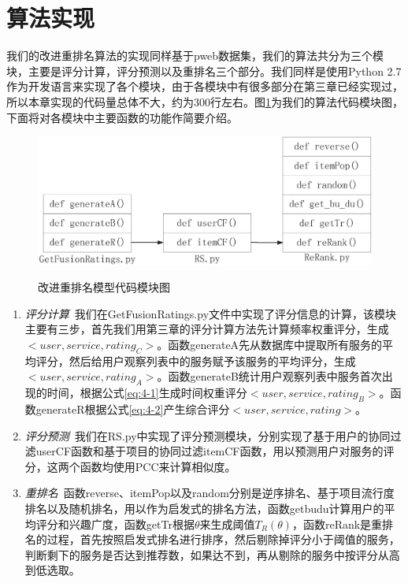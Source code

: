 \documentclass[master,winfonts]{njuthesis}
\newcommand{\li}{\uline{\hspace{0.5em}}}
\begin{document}
\section{算法实现}
我们的改进重排名算法的实现同样基于pweb数据集，我们的算法共分为三个模块，主要是评分计算，评分预测以及重排名三个部分。我们同样是使用Python 2.7作为开发语言来实现了各个模块，由于各模块中有很多部分在第三章已经实现过，所以本章实现的代码量总体不大，约为300行左右。图\ref{fig:4-20}为我们的算法代码模块图，下面将对各模块中主要函数的功能作简要介绍。
\begin{figure}[htbp]
  \centering
  \includegraphics[width=\textwidth]{Code2.eps}\\
  \caption{改进重排名模型代码模块图}\label{fig:4-20}
\end{figure}

\begin{enumerate}
\item \emph{评分计算}~我们在GetFusionRatings.py文件中实现了评分信息的计算，该模块主要有三步，首先我们用第三章的评分计算方法先计算频率权重评分，生成$<user,service,rating_C>$。函数generateA先从数据库中提取所有服务的平均评分，然后给用户观察列表中的服务赋予该服务的平均评分，生成$<user,service,rating_A>$。函数generateB统计用户观察列表中服务首次出现的时间，根据公式\eqref{eq:4-1}生成时间权重评分$<user,service,rating_B>$。函数generateR根据公式\eqref{eq:4-2}产生综合评分$<user,service,rating>$。

\item \emph{评分预测}~我们在RS.py中实现了评分预测模块，分别实现了基于用户的协同过滤userCF函数和基于项目的协同过滤itemCF函数，用以预测用户对服务的评分，这两个函数均使用PCC来计算相似度。

\item \emph{重排名}~函数reverse、itemPop以及random分别是逆序排名、基于项目流行度排名以及随机排名，用以作为启发式的排名方法，函数get\li bu\li du计算用户的平均评分和兴趣广度，函数getTr根据$\theta$来生成阈值$T_R(\theta)$，函数reRank是重排名的过程，首先按照启发式排名进行排序，然后剔除掉评分小于阈值的服务，判断剩下的服务是否达到推荐数，如果达不到，再从剔除的服务中按评分从高到低选取。

\end{enumerate}
\end{document}
